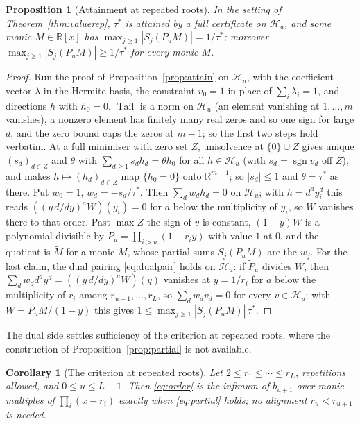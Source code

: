 \documentclass[11pt]{article}
\newtheorem{corollary}[theorem]{Corollary}
\newtheorem{proposition}[theorem]{Proposition}
\theoremstyle{definition}
\theoremstyle{plain}
\newcommand{\R}{\mathbb R}
\DeclareMathOperator{\Tail}{Tail}
\DeclareMathOperator{\sgn}{sgn}
\begin{document}
\begin{proposition}[Attainment at repeated roots]\label{prop:attainrep}
In the setting of Theorem~\ref{thm:valuerep}, $\tau^*$ is attained by a full
certificate on $\mathcal H_u$, and some monic $M\in\R[x]$ has
$\max_{j\ge1}|S_j(P_uM)|=1/\tau^*$; moreover
$\max_{j\ge1}|S_j(P_uM)|\ge1/\tau^*$ for every monic $M$.
\end{proposition}

\begin{proof}
Run the proof of Proposition~\ref{prop:attain} on $\mathcal H_u$, with the
coefficient vector $\lambda$ in the Hermite basis, the constraint $v_0=1$ in
place of $\sum_i\lambda_i=1$, and directions $h$ with $h_0=0$.  $\Tail$ is a
norm on $\mathcal H_u$ (an element vanishing at $1,\ldots,m$ vanishes), a
nonzero element has finitely many real zeros and so one sign for large $d$,
and the zero bound caps the zeros at $m-1$; so the first two steps hold
verbatim.  At a full minimiser with zero set $Z$, unisolvence at
$\{0\}\cup Z$ gives unique $(s_d)_{d\in Z}$ and $\theta$ with
$\sum_{d\ge1}s_dh_d=\theta h_0$ for all $h\in\mathcal H_u$ (with
$s_d=\sgn v_d$ off $Z$), and makes $h\mapsto(h_d)_{d\in Z}$ map
$\{h_0=0\}$ onto $\R^{m-1}$; so $|s_d|\le1$ and $\theta=\tau^*$ as there.
Put $w_0=1$, $w_d=-s_d/\tau^*$.  Then $\sum_dw_dh_d=0$ on $\mathcal H_u$;
with $h=d^ay_i^d$ this reads $((y\,d/dy)^aW)(y_i)=0$ for $a$ below the
multiplicity of $y_i$, so $W$ vanishes there to that order.  Past $\max Z$
the sign of $v$ is constant, $(1-y)W$ is a polynomial divisible by
$\widetilde P_u=\prod_{i>u}(1-r_iy)$ with value $1$ at $0$, and the quotient
is $\widetilde M$ for a monic $M$, whose partial sums $S_j(P_uM)$ are the
$w_j$.  For the last claim, the dual pairing \eqref{eq:dualpair} holds on
$\mathcal H_u$: if $\widetilde P_u$ divides $W$, then
$\sum_dw_dd^ay^d=((y\,d/dy)^aW)(y)$ vanishes at $y=1/r_i$ for $a$ below the
multiplicity of $r_i$ among $r_{u+1},\ldots,r_L$, so $\sum_dw_dv_d=0$ for
every $v\in\mathcal H_u$; with $W=\widetilde P_u\widetilde M/(1-y)$ this
gives $1\le\max_{j\ge1}|S_j(P_uM)|\,\tau^*$.
\end{proof}

The dual side settles sufficiency of the criterion at repeated roots, where
the construction of Proposition~\ref{prop:partial} is not available.

\begin{corollary}[The criterion at repeated roots]\label{cor:charrep}
Let $2\le r_1\le\cdots\le r_L$, repetitions allowed, and $0\le u\le L-1$.
Then \eqref{eq:order} is the infimum of $b_{u+1}$ over monic multiples of
$\prod_i(x-r_i)$ exactly when \eqref{eq:partial} holds; no alignment
$r_u<r_{u+1}$ is needed.
\end{corollary}
\end{document}
